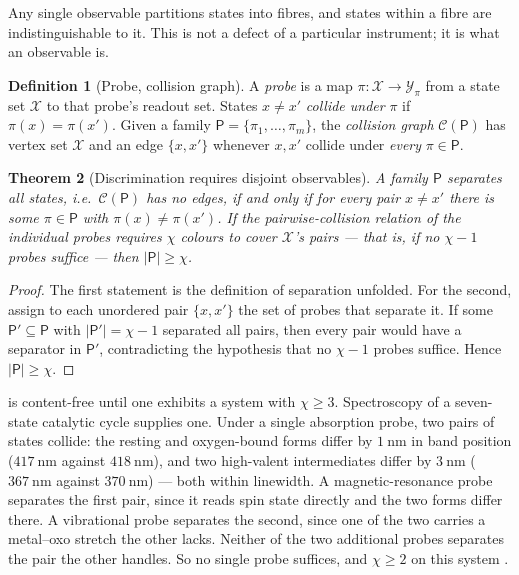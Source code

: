 \documentclass[11pt,twocolumn,a4paper]{article}
\theoremstyle{plain}
\newtheorem{theorem}{Theorem}[section]
\theoremstyle{definition}
\newtheorem{definition}[theorem]{Definition}
\theoremstyle{remark}
\newcommand{\pan}{\mathsf{P}}
\begin{document}
Any single observable partitions states into fibres, and states within a fibre
are indistinguishable to it. This is not a defect of a particular instrument; it
is what an observable is.

\begin{definition}[Probe, collision graph]
\label{def:probe}
A \emph{probe} is a map $\pi : \mathcal{X} \to \mathcal{Y}_\pi$ from a state set
$\mathcal{X}$ to that probe's readout set. States $x\ne x'$ \emph{collide under}
$\pi$ if $\pi(x) = \pi(x')$. Given a family
$\pan = \{\pi_1,\dots,\pi_m\}$, the \emph{collision graph} $\mathcal{C}(\pan)$
has vertex set $\mathcal{X}$ and an edge $\{x,x'\}$ whenever $x,x'$ collide
under \emph{every} $\pi\in\pan$.
\end{definition}

\begin{theorem}[Discrimination requires disjoint observables]
\label{thm:discrimination}
A family $\pan$ separates all states, i.e.\ $\mathcal{C}(\pan)$ has no edges, if
and only if for every pair $x \ne x'$ there is some $\pi\in\pan$ with
$\pi(x)\ne\pi(x')$. If the pairwise-collision relation of the individual probes
requires $\chi$ colours to cover $\mathcal{X}$'s pairs --- that is, if no
$\chi-1$ probes suffice --- then $|\pan|\ge\chi$.
\end{theorem}

\begin{proof}
The first statement is the definition of separation unfolded. For the second,
assign to each unordered pair $\{x,x'\}$ the set of probes that separate it. If
some $\pan'\subseteq\pan$ with $|\pan'| = \chi-1$ separated all pairs, then
every pair would have a separator in $\pan'$, contradicting the hypothesis that
no $\chi-1$ probes suffice. Hence $|\pan|\ge\chi$.
\end{proof}

 is content-free until one exhibits a system with
$\chi \ge 3$. Spectroscopy of a seven-state catalytic cycle supplies one. Under
a single absorption probe, two pairs of states collide: the resting and
oxygen-bound forms differ by $\SI{1}{\nano\metre}$ in band position
($\SI{417}{\nano\metre}$ against $\SI{418}{\nano\metre}$), and two high-valent
intermediates differ by $\SI{3}{\nano\metre}$ ($\SI{367}{\nano\metre}$ against
$\SI{370}{\nano\metre}$) --- both within linewidth. A magnetic-resonance probe
separates the first pair, since it reads spin state directly and the two forms
differ there. A vibrational probe separates the second, since one of the two
carries a metal--oxo stretch the other lacks. Neither of the two additional
probes separates the pair the other handles. So no single probe suffices, and
$\chi\ge 2$ on this system \citep{Denisov2005,Rittle2010}.
\end{document}
